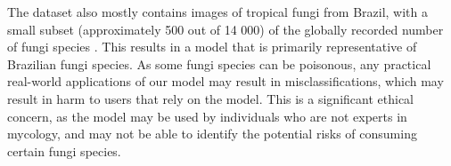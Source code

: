 \documentclass{article} %
\begin{document}
The dataset also mostly contains images of tropical fungi from Brazil, with a small subset (approximately 500 out of 14 000) of the globally recorded number of fungi species \citep{LuckingAimeEtAl.UnambiguousIdentificationFungi.2020}. This results in a model that is primarily representative of Brazilian fungi species. As some fungi species can be poisonous, any practical real-world applications of our model may result in misclassifications, which may result in harm to users that rely on the model. This is a significant ethical concern, as the model may be used by individuals who are not experts in mycology, and may not be able to identify the potential risks of consuming certain fungi species.

\label{last_page}



\end{document}
